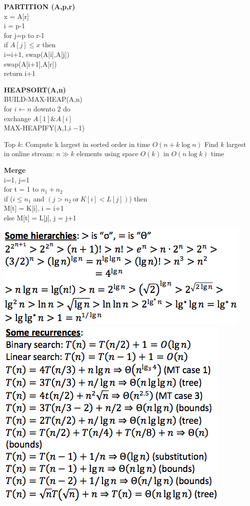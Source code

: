 \documentclass[10pt,landscape]{article}
\begin{document}
\begin{multicols}{3}
\textbf{PARTITION (A,p,r) }
\\\quad x = A[r]
\\\quad i = p-1
\\\quad for j=p to r-1
\\\quad \quad if $A[j] \le x$ then 
\\\quad \quad \quad i=i+1, swap(A[i],A[j])
\\\quad swap(A[i+1],A[r])
\\\quad return i+1


\textbf{HEAPSORT(A,n)}
\\BUILD-MAX-HEAP(A,n)
\\for $ i \gets n $ downto 2 do
\\\quad exchange $ A[1] \& A[i] $
\\\quad MAX-HEAPIFY(A,1,i −1)

Top $ k $: Compute k largest in sorted order in time $ O(n+k\log n) $
Find $ k $ largest in online stream: $ n\gg k $ elements using space $ O(k) $ in $ O(n\log k) $ time


\textbf{Merge}
\\i=1, j=1
\\for t = 1 to $n_1+n_2$
\\\quad if ($i\le n_1$ and $(j>n_2 \mathrm{\ or\ } K[i]<L[j])$) then
\\\qquad M[t] = K[i], i = i+1
\\\quad else M[t] = L[j], j = j+1 

\includegraphics[scale=0.5]{asymptotic.png}
\includegraphics[scale=0.5]{recurrence.png}



\end{multicols}
\end{document}
